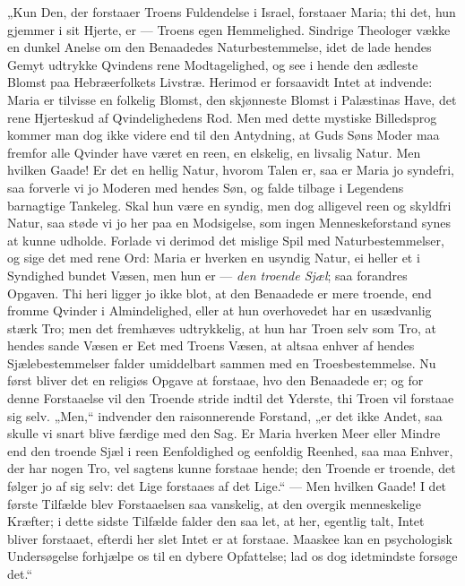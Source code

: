 \documentclass[12pt,a4paper]{book}
\begin{document}
„Kun Den, der forstaaer Troens Fuldendelse i Israel, forstaaer Maria; thi det,
hun gjemmer i sit Hjerte, er --- Troens egen Hemmelighed. Sindrige Theologer
vække en dunkel Anelse om den Benaadedes Naturbestemmelse, idet de lade hendes
Gemyt udtrykke Qvindens rene Modtagelighed, og see i hende den ædleste Blomst
paa Hebræerfolkets Livstræ. Herimod er forsaavidt Intet at indvende: Maria er
tilvisse en folkelig Blomst, den skjønneste Blomst i Palæstinas Have, det rene
Hjerteskud af Qvindelighedens Rod. Men med dette mystiske Billedsprog kommer man
dog ikke videre end til den Antydning, at Guds Søns Moder maa fremfor alle
Qvinder have været en reen, en elskelig, en livsalig Natur. Men hvilken Gaade!
Er det en hellig Natur, hvorom Talen er, saa er Maria jo syndefri, saa
forverle vi jo Moderen med hendes Søn, og falde tilbage i Legendens barnagtige
Tankeleg. Skal hun være en syndig, men dog alligevel reen og skyldfri Natur, saa
støde vi jo her paa en Modsigelse, som ingen Menneskeforstand synes at kunne
udholde. Forlade vi derimod det mislige Spil med Naturbestemmelser, og sige det
med rene Ord: Maria er hverken en usyndig Natur, ei heller et i Syndighed bundet
Væsen, men hun er --- \emph{den troende Sjæl}; saa forandres Opgaven. Thi heri
ligger jo ikke blot, at den Benaadede er mere troende, end fromme Qvinder i
Almindelighed,
eller at hun overhovedet har en usædvanlig stærk Tro; men det fremhæves
udtrykkelig, at hun har Troen selv som Tro, at hendes sande Væsen er Eet med
Troens Væsen, at altsaa enhver af hendes Sjælebestemmelser falder umiddelbart
sammen med en Troesbestemmelse. Nu først bliver det en religiøs Opgave at
forstaae, hvo den Benaadede er; og for denne Forstaaelse vil den Troende stride
indtil det Yderste, thi Troen vil forstaae sig selv. „Men,“ indvender den
raisonnerende Forstand, „er det ikke Andet, saa skulle vi snart blive færdige
med den Sag. Er Maria hverken Meer eller Mindre end den troende Sjæl i reen
Eenfoldighed og eenfoldig Reenhed, saa maa Enhver, der har nogen Tro, vel
sagtens kunne forstaae hende; den Troende er troende, det følger jo af sig selv:
det Lige forstaaes af det Lige.“ --- Men hvilken Gaade! I det første Tilfælde
blev Forstaaelsen saa vanskelig, at den overgik menneskelige Kræfter; i dette
sidste Tilfælde falder den saa let, at her, egentlig talt, Intet bliver
forstaaet, efterdi her slet Intet er at forstaae. Maaskee kan en psychologisk
Undersøgelse forhjælpe os til en dybere Opfattelse; lad os dog idetmindste
forsøge det.“
\end{document}
